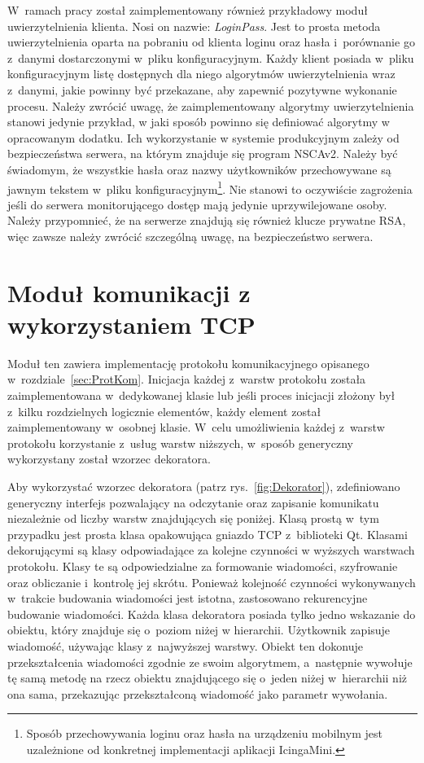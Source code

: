 W~ramach pracy został zaimplementowany również przykładowy moduł
uwierzytelnienia klienta. Nosi on nazwie: {\em LoginPass}. Jest to
prosta metoda uwierzytelnienia oparta na pobraniu od klienta loginu
oraz hasła i~porównanie go z~danymi dostarczonymi w~pliku
konfiguracyjnym. Każdy klient posiada w~pliku konfiguracyjnym listę
dostępnych dla niego algorytmów uwierzytelnienia wraz z~danymi, jakie
powinny być przekazane, aby zapewnić pozytywne wykonanie
procesu. Należy zwrócić uwagę, że zaimplementowany algorytmy
uwierzytelnienia stanowi jedynie przykład, w jaki sposób powinno się
definiować algorytmy w opracowanym dodatku. Ich wykorzystanie w
systemie produkcyjnym zależy od bezpieczeństwa serwera, na którym
znajduje się program NSCAv2. Należy być świadomym, że wszystkie hasła
oraz nazwy użytkowników przechowywane są jawnym tekstem w~pliku
konfiguracyjnym\footnote{Sposób przechowywania loginu oraz hasła na
  urządzeniu mobilnym jest uzależnione od konkretnej implementacji
  aplikacji IcingaMini.}. Nie stanowi to oczywiście zagrożenia jeśli
do serwera monitorującego dostęp mają jedynie uprzywilejowane
osoby. Należy przypomnieć, że na serwerze znajdują się również klucze
prywatne RSA, więc zawsze należy zwrócić szczególną uwagę, na
bezpieczeństwo serwera.

\section[Moduł TCP][Moduł komunikacji z wykorzystaniem TCP]{Moduł komunikacji z wykorzystaniem TCP}

Moduł ten zawiera implementację protokołu komunikacyjnego opisanego
w~rozdziale~\ref{sec:ProtKom}. Inicjacja każdej z~warstw protokołu
została zaimplementowana w~dedykowanej klasie lub jeśli proces
inicjacji złożony był z~kilku rozdzielnych logicznie elementów, każdy
element został zaimplementowany w~osobnej klasie. W~celu umożliwienia
każdej z~warstw protokołu korzystanie z~usług warstw niższych,
w~sposób generyczny wykorzystany został wzorzec dekoratora.

Aby wykorzystać wzorzec dekoratora (patrz rys.~\ref{fig:Dekorator}),
zdefiniowano generyczny interfejs pozwalający na odczytanie oraz
zapisanie komunikatu niezależnie od liczby warstw znajdujących się
poniżej. Klasą prostą w~tym przypadku jest prosta klasa opakowująca
gniazdo TCP z~biblioteki Qt. Klasami dekorującymi są klasy
odpowiadające za kolejne czynności w wyższych warstwach
protokołu. Klasy te są odpowiedzialne za formowanie wiadomości,
szyfrowanie oraz obliczanie i~kontrolę jej skrótu. Ponieważ kolejność
czynności wykonywanych w~trakcie budowania wiadomości jest istotna,
zastosowano rekurencyjne budowanie wiadomości. Każda klasa dekoratora
posiada tylko jedno wskazanie do obiektu, który znajduje się o~poziom
niżej w hierarchii. Użytkownik zapisuje wiadomość, używając klasy
z~najwyższej warstwy. Obiekt ten dokonuje przekształcenia wiadomości
zgodnie ze swoim algorytmem, a~następnie wywołuje tę samą metodę na
rzecz obiektu znajdującego się o~jeden niżej w~hierarchii niż ona
sama, przekazując przekształconą wiadomość jako parametr wywołania.

